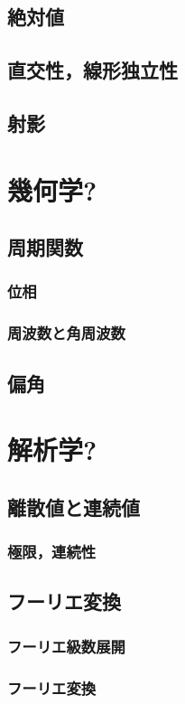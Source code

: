 \documentclass[11pt,a4paper]{jreport}
\begin{document}
\section{絶対値}
\section{直交性，線形独立性}
\section{射影}


\chapter{幾何学?}
\section{周期関数}
\subsection{位相}
\subsection{周波数と角周波数}
\section{偏角}

\chapter{解析学?}
\section{離散値と連続値}
\subsection{極限，連続性}
\section{フーリエ変換}
\subsection{フーリエ級数展開}
\subsection{フーリエ変換}
\end{document}
